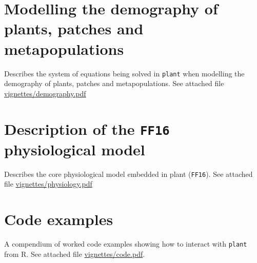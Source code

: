 \documentclass[a4paper,11pt]{article}
\newcommand{\plant}{\texttt{plant}}
\begin{document}
\begin{appendices}\label{sec:appendices}

\section{Modelling the demography of plants, patches and metapopulations}\label{sec:demography}

Describes the system of equations being solved in {\plant} when modelling the demography of plants, patches and metapopulations. See attached file \url{vignettes/demography.pdf}

\section{Description of the \texttt{FF16} physiological model}\label{sec:FF16}

Describes the core physiological model embedded in plant (\texttt{FF16}). See attached file \url{vignettes/physiology.pdf}

\section{Code examples}\label{sec:code}

A compendium of worked code examples showing how to interact with {\plant} from R.
See attached file \url{vignettes/code.pdf}.

\end{appendices}
\end{document}
